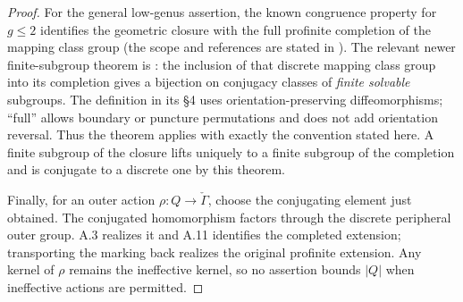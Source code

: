 \begin{proof}
For the general low-genus assertion, the known congruence
property for $g\le2$ identifies the geometric closure with
the full profinite completion of the mapping class group
(the scope and references are stated in
\citealp[\S1.1]{Boggi2026Symmetric}). The relevant newer
finite-subgroup theorem is
\citet[Theorem C(i), equivalently Theorem 5.1(i) with empty boundary]{Boggi2026Symmetric}:
the inclusion of that discrete mapping class group into its
completion gives a bijection on conjugacy classes of
\emph{finite solvable} subgroups. The definition in its
\S4 uses orientation-preserving diffeomorphisms; ``full''
allows boundary or puncture permutations and does not add
orientation reversal. Thus the theorem applies with exactly
the convention stated here. A finite subgroup of the closure
lifts uniquely to a finite subgroup of the completion and
is conjugate to a discrete one by this theorem.

Finally, for an outer action $\rho:Q\to\check\Gamma$, choose
the conjugating element just obtained. The conjugated
homomorphism factors through the discrete peripheral outer
group. A.3 realizes it and A.11 identifies the completed
extension; transporting the marking back realizes the
original profinite extension. Any kernel of $\rho$ remains
the ineffective kernel, so no assertion bounds $|Q|$ when
ineffective actions are permitted.
\end{proof}

